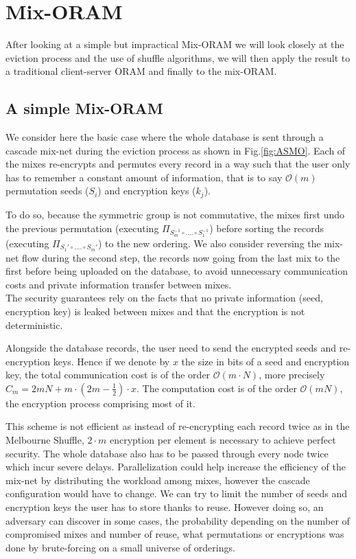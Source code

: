 \documentclass{llncs}
\begin{document}
\section{Mix-ORAM}\label{Mix-ORAM}
After looking at a simple but impractical Mix-ORAM we will look closely at the eviction process and the use of shuffle algorithms, we will then apply the result to a traditional client-server ORAM and finally to the mix-ORAM.
%
\subsection{A simple Mix-ORAM}
%
We consider here the basic case where the whole database is sent through a cascade mix-net during the eviction process as shown in Fig.\ref{fig:ASMO}.
Each of the mixes re-encrypts and permutes every record in a way such that the user only has to remember a constant amount of information, that is to say $\mathcal{O}\left ( m \right )$ permutation seeds ($S_i$) and encryption keys ($k_j$).

To do so, because the symmetric group is not commutative, the mixes first undo the previous permutation (executing $\Pi_{S_m^{-1} \circ .... \circ S_1^{-1}}$) before sorting the records (executing $\Pi_{S_1' \circ .... \circ S_m'}$) to the new ordering. We also consider reversing the mix-net flow during the second step, the records now going from the last mix to the first before being uploaded on the database, to avoid unnecessary communication costs and private information transfer between mixes.\\
The security guarantees rely on the facts that no private information (seed, encryption key) is leaked between mixes and that the encryption is not deterministic.

Alongside the database records, the user need to send the encrypted seeds and re-encryption keys. Hence if we denote by $x$ the size in bits of a seed and encryption key, the total communication cost is of the order $\mathcal{O}\left ( m\cdot N \right )$, more precisely $C_m=2mN + m\cdot(2m-\frac{1}{2})\cdot x$.
The computation cost is of the order $\mathcal{O}\left(mN\right)$, the encryption process comprising most of it.

This scheme is not efficient as instead of re-encrypting each record twice as in the Melbourne Shuffle, $2\cdot m$ encryption per element is necessary to achieve perfect security. The whole database also has to be passed through every node twice which incur severe delays. Parallelization could help increase the efficiency of the mix-net by distributing the workload among mixes, however the cascade configuration would have to change.
We can try to limit the number of seeds and encryption keys the user has to store thanks to reuse. However doing so, an adversary can discover in some cases, the probability depending on the number of compromised mixes and number of reuse, what permutations or encryptions was done by brute-forcing on a small universe of orderings.
\end{document}

